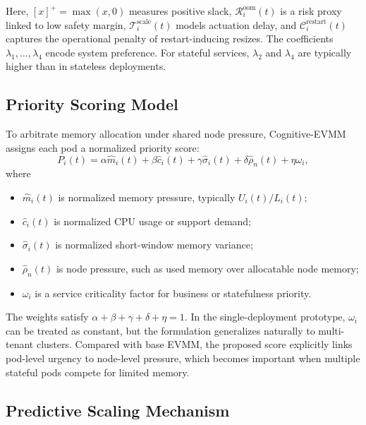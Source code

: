 \documentclass[12pt,a4paper]{article}
\begin{document}
Here, $[x]^+ = \max(x,0)$ measures positive slack, $\mathcal{R}^{\text{oom}}_i(t)$ is a risk proxy linked to low safety margin, $\mathcal{T}^{\text{scale}}_i(t)$ models actuation delay, and $\mathcal{C}^{\text{restart}}_i(t)$ captures the operational penalty of restart-inducing resizes. The coefficients $\lambda_1,\dots,\lambda_4$ encode system preference. For stateful services, $\lambda_2$ and $\lambda_4$ are typically higher than in stateless deployments.

\subsection{Priority Scoring Model}

To arbitrate memory allocation under shared node pressure, Cognitive-EVMM assigns each pod a normalized priority score:
\begin{equation}
\label{eq:priority}
P_i(t) = \alpha \hat{m}_i(t) + \beta \hat{c}_i(t) + \gamma \hat{\sigma}_i(t) + \delta \hat{\rho}_n(t) + \eta \omega_i,
\end{equation}
where
\begin{itemize}
    \item $\hat{m}_i(t)$ is normalized memory pressure, typically $U_i(t)/L_i(t)$;
    \item $\hat{c}_i(t)$ is normalized CPU usage or support demand;
    \item $\hat{\sigma}_i(t)$ is normalized short-window memory variance;
    \item $\hat{\rho}_n(t)$ is node pressure, such as used memory over allocatable node memory;
    \item $\omega_i$ is a service criticality factor for business or statefulness priority.
\end{itemize}

The weights satisfy $\alpha+\beta+\gamma+\delta+\eta=1$. In the single-deployment prototype, $\omega_i$ can be treated as constant, but the formulation generalizes naturally to multi-tenant clusters. Compared with base EVMM, the proposed score explicitly links pod-level urgency to node-level pressure, which becomes important when multiple stateful pods compete for limited memory.

\subsection{Predictive Scaling Mechanism}
\end{document}

